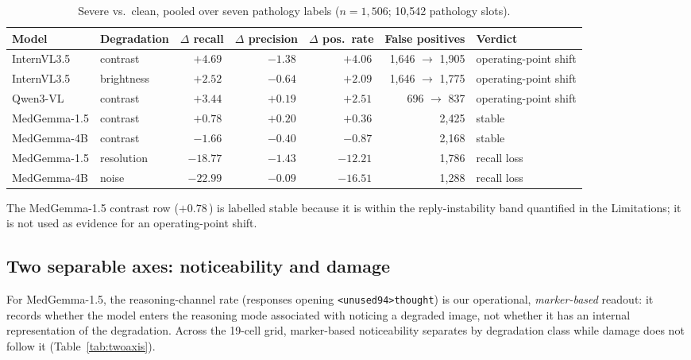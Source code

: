 \begin{table}[t]
\centering
\small
\caption{Severe vs.\ clean, pooled over seven pathology labels ($n=1{,}506$; 10,542 pathology slots).}
\label{tab:op}
\begin{tabular}{llrrrrl}
\toprule
Model & Degradation & $\Delta$ recall & $\Delta$ precision & $\Delta$ pos.\ rate & False positives & Verdict \\
\midrule
InternVL3.5 & contrast & $\mathbf{+4.69}$\,\pp{} & $-1.38$\,\pp{} & $\mathbf{+4.06}$\,\pp{} & 1,646 $\rightarrow$ 1,905 & operating-point shift \\
InternVL3.5 & brightness & $+2.52$\,\pp{} & $-0.64$\,\pp{} & $+2.09$\,\pp{} & 1,646 $\rightarrow$ 1,775 & operating-point shift \\
Qwen3-VL & contrast & $+3.44$\,\pp{} & $+0.19$\,\pp{} & $+2.51$\,\pp{} & 696 $\rightarrow$ 837 & operating-point shift \\
MedGemma-1.5 & contrast & $+0.78$\,\pp{} & $+0.20$\,\pp{} & $+0.36$\,\pp{} & 2,425 & stable \\
MedGemma-4B & contrast & $-1.66$\,\pp{} & $-0.40$\,\pp{} & $-0.87$\,\pp{} & 2,168 & stable \\
MedGemma-1.5 & resolution & $\mathbf{-18.77}$\,\pp{} & $-1.43$\,\pp{} & $-12.21$\,\pp{} & 1,786 & recall loss \\
MedGemma-4B & noise & $\mathbf{-22.99}$\,\pp{} & $-0.09$\,\pp{} & $-16.51$\,\pp{} & 1,288 & recall loss \\
\bottomrule
\end{tabular}
\end{table}

The MedGemma-1.5 contrast row ($+0.78$\,\pp{}) is labelled stable because it is within the reply-instability band quantified in the Limitations; it is not used as evidence for an operating-point shift.

\subsection{Two separable axes: noticeability and damage}
\label{sec:results-twoaxis}

For MedGemma-1.5, the reasoning-channel rate (responses opening \texttt{<unused94>thought}) is our operational, \emph{marker-based} readout: it records whether the model enters the reasoning mode associated with noticing a degraded image, not whether it has an internal representation of the degradation. Across the 19-cell grid, marker-based noticeability separates by degradation class while damage does not follow it (Table~\ref{tab:twoaxis}).

